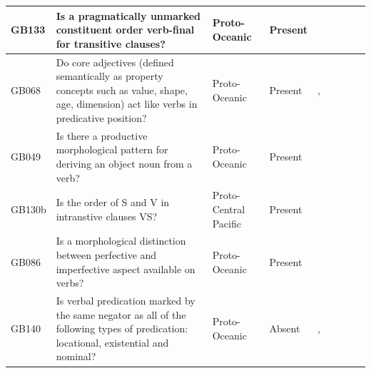 \documentclass[a4paper,10pt]{article} %
\begin{document}
\begin{landscape}
\begin{longtable}{| p{2cm}| p{3cm}| p{2.5cm}|p{2cm}|p{2cm}|p{2cm}|p{2cm}|p{2cm}|p{2cm}|}
GB133&Is a pragmatically unmarked constituent order verb-final for transitive clauses?&Proto-Oceanic&Present&\citet[118]{pawley1973some}& \cellcolor{hedvig_red!50}{False Negative} & \cellcolor{hedvig_yellow!50}{Half} & \cellcolor{hedvig_yellow!50}{False Negative} & \cellcolor{hedvig_lightgreen!50}{True Positive} \\ \hline
GB068&Do core adjectives (defined semantically as property concepts such as value, shape, age, dimension) act like verbs in predicative position?&Proto-Oceanic&Present&\citet[63, 74]{lynchrosscrowley_proto_grammar_oceanic}, \citet[113]{pawley1973some}& \cellcolor{hedvig_lightgreen!50}{True Positive} & \cellcolor{hedvig_yellow!50}{Half} & \cellcolor{hedvig_yellow!50}{Half} & \cellcolor{hedvig_yellow!50}{Half} \\ \hline
GB049&Is there a productive morphological pattern for deriving an object noun from a verb?&Proto-Oceanic&Present&\citet[70]{lynchrosscrowley_proto_grammar_oceanic}& \cellcolor{hedvig_lightgreen!50}{True Positive} & \cellcolor{hedvig_yellow!50}{Half} & \cellcolor{hedvig_yellow!50}{Half} & \cellcolor{hedvig_yellow!50}{Half} \\ \hline
GB130b&Is the order of S and V in intranstive clauses VS?&Proto-Central Pacific&Present&\citet[122]{kikusawa2002proto}& \cellcolor{hedvig_yellow!50}{Half} & \cellcolor{hedvig_yellow!50}{Half} & \cellcolor{hedvig_yellow!50}{False Negative} & \cellcolor{hedvig_yellow!50}{Half} \\ \hline
GB086&Is a morphological distinction between perfective and imperfective aspect available on verbs?&Proto-Oceanic&Present&\citet[84]{lynchrosscrowley_proto_grammar_oceanic}& \cellcolor{hedvig_red!50}{False Negative} & \cellcolor{hedvig_yellow!50}{Half} & \cellcolor{hedvig_yellow!50}{False Negative} & \cellcolor{hedvig_yellow!50}{Half} \\ \hline
GB140&Is verbal predication marked by the same negator as all of the following types of predication: locational, existential and nominal?&Proto-Oceanic&Absent&\citet[143-6]{pawley1973some}, \citet[88]{lynchrosscrowley_proto_grammar_oceanic}& \cellcolor{hedvig_yellow!50}{Half} & \cellcolor{hedvig_yellow!50}{Half} & \cellcolor{hedvig_red!50}{False Positive} & \cellcolor{hedvig_yellow!50}{Half} \\ \hline



 \end{longtable}
\end{landscape}
\newpage
\end{document}
